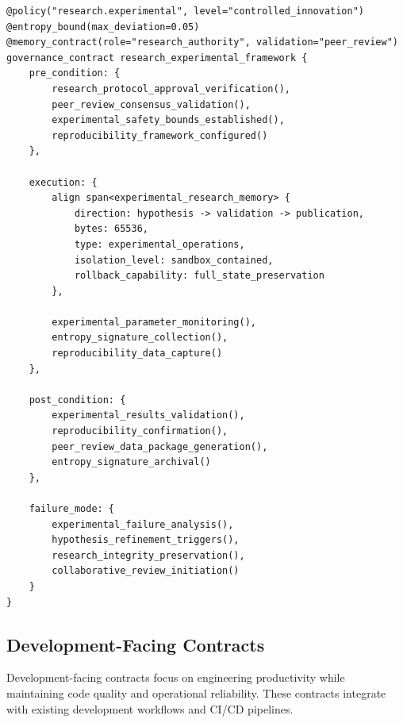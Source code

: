 \documentclass[11pt,letterpaper]{article}
\begin{document}
\begin{lstlisting}[language=rift, caption=Research Experimental Framework Contract]
@policy("research.experimental", level="controlled_innovation")
@entropy_bound(max_deviation=0.05)
@memory_contract(role="research_authority", validation="peer_review")
governance_contract research_experimental_framework {
    pre_condition: {
        research_protocol_approval_verification(),
        peer_review_consensus_validation(),
        experimental_safety_bounds_established(),
        reproducibility_framework_configured()
    },
    
    execution: {
        align span<experimental_research_memory> {
            direction: hypothesis -> validation -> publication,
            bytes: 65536,
            type: experimental_operations,
            isolation_level: sandbox_contained,
            rollback_capability: full_state_preservation
        },
        
        experimental_parameter_monitoring(),
        entropy_signature_collection(),
        reproducibility_data_capture()
    },
    
    post_condition: {
        experimental_results_validation(),
        reproducibility_confirmation(),
        peer_review_data_package_generation(),
        entropy_signature_archival()
    },
    
    failure_mode: {
        experimental_failure_analysis(),
        hypothesis_refinement_triggers(),
        research_integrity_preservation(),
        collaborative_review_initiation()
    }
}
\end{lstlisting}

\subsection{Development-Facing Contracts}

Development-facing contracts focus on engineering productivity while maintaining code quality and operational reliability. These contracts integrate with existing development workflows and CI/CD pipelines.
\end{document}
